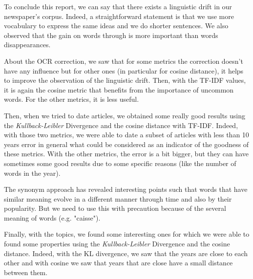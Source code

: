 To conclude this report, we can say that there exists a linguistic drift in our newspaper's corpus. Indeed, a straightforward statement is that we use more vocabulary to express the same ideas and we do shorter sentences. We also observed that the gain on words through is more important than words disappearances.

About the OCR correction, we saw that for some metrics the correction doesn't have any influence but for other ones (in particular for cosine distance), it helps to improve the observation of the linguistic drift. Then, with the TF-IDF values, it is again the cosine metric that benefits from the importance of uncommon words. For the other metrics, it is less useful.

Then, when we tried to date articles, we obtained some really good results using the \emph{Kullback-Leibler} Divergence and the cosine distance with TF-IDF. Indeed, with those two metrics, we were able to date a subset of articles with less than 10 years error in general what could be considered as an indicator of the goodness of these metrics. With the other metrics, the error is a bit bigger, but they can have sometimes some good results due to some specific reasons (like the number of words in the year).

The synonym approach has revealed interesting points such that words that have similar meaning evolve in a different manner through time and also by their popularity. But we need to use this with precaution because of the several meaning of words (e.g. "caisse"). 

Finally, with the topics, we found some interesting ones for which we were able to found some properties using the \emph{Kullback-Leibler} Divergence and the cosine distance. Indeed, with the KL divergence, we saw that the years are close to each other and with cosine we saw that years that are close have a small distance between them.
